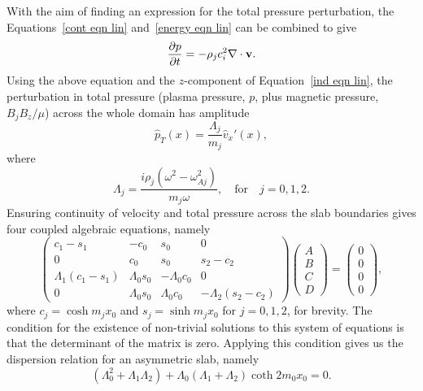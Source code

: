 With the aim of finding an expression for the total pressure perturbation, the Equations~\eqref{cont eqn lin} and~\eqref{energy eqn lin} can be combined to give
\begin{equation}
	\frac{\partial p}{\partial t} = - \rho_jc_i^2\nabla\cdot\mathbf{v}.
\end{equation}
Using the above equation and the $z$-component of Equation~\eqref{ind eqn lin}, the perturbation in total pressure (plasma pressure, $p$, plus magnetic pressure, $B_jB_z/\mu$) across the whole domain has amplitude
\begin{equation}
\widehat{p}_T(x) = \frac{\Lambda_j}{m_j}\widehat{v}_x'(x), \label{tot p}
\end{equation}
where
\begin{equation}
\Lambda_j = \frac{i\rho_j(\omega^2 - \omega_{Aj}^2)}{m_j\omega}, \quad \text{for} \quad j = 0, 1, 2. \label{Lambdas}
\end{equation}
Ensuring continuity of velocity and total pressure across the slab boundaries gives four coupled algebraic equations, namely
\begin{equation}
\left(
\begin{matrix}
c_1-s_1             &-c_0           &s_0            &0                   \\
0                   &c_0            &s_0            &s_2-c_2             \\
\Lambda_1(c_1-s_1)  &\Lambda_0s_0   &-\Lambda_0c_0  &0                   \\
0                   &\Lambda_0s_0   &\Lambda_0c_0   &-\Lambda_2(s_2-c_2)
\end{matrix}
\right)
\left(
\begin{matrix}
A \\
B \\
C \\
D
\end{matrix}
\right)
=
\left(
\begin{matrix}
0 \\
0 \\
0 \\
0
\end{matrix}
\right),
\end{equation}
where $c_j = \cosh{m_jx_0}$ and $s_j = \sinh{m_jx_0}$ for $j=0,1,2$, for brevity. The condition for the existence of non-trivial solutions to this system of equations is that the determinant of the matrix is zero. Applying this condition gives us the dispersion relation for an asymmetric slab, namely
\begin{equation}
(\Lambda_0^2 + \Lambda_1\Lambda_2) + \Lambda_0(\Lambda_1 + \Lambda_2)\coth{2m_0x_0} = 0. \label{DR lambda}
\end{equation}
